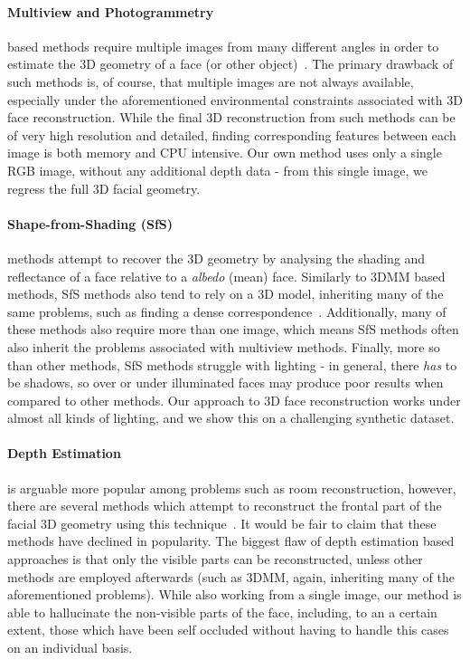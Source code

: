 \paragraph{Multiview and Photogrammetry} based methods require
multiple images from many different angles in order to estimate the 3D
geometry of a face (or other
object)~\cite{dou2018multi,dai2018coarse,Piotraschke_2016_CVPR,mayo20093d}. The
primary drawback of such methods is, of course, that multiple images
are not always available, especially under the aforementioned
environmental constraints associated with 3D face
reconstruction. While the final 3D reconstruction from such methods
can be of very high resolution and detailed, finding corresponding
features between each image is both memory and CPU intensive. Our own
method uses only a single RGB image, without any additional depth data
- from this single image, we regress the full 3D facial geometry.

\paragraph{Shape-from-Shading (SfS)} methods attempt to recover the 3D
geometry by analysing the shading and reflectance of a face relative
to a \textit{albedo} (mean) face. Similarly to 3DMM based methods, SfS
methods also tend to rely on a 3D model, inheriting many of the same
problems, such as finding a dense
correspondence~\cite{suwajanakorn2014total,jiang20183d}. Additionally,
many of these methods also require more than one image, which means
SfS methods often also inherit the problems associated with multiview
methods. Finally, more so than other methods, SfS methods struggle
with lighting - in general, there \textit{has} to be shadows, so over
or under illuminated faces may produce poor results when compared to
other methods. Our approach to 3D face reconstruction works under
almost all kinds of lighting, and we show this on a challenging
synthetic dataset.

\paragraph{Depth Estimation} is arguable more popular among problems
such as room reconstruction, however, there are several methods which
attempt to reconstruct the frontal part of the facial 3D geometry
using this technique~\cite{sun2011depth,sun2013depth}. It would be
fair to claim that these methods have declined in popularity. The
biggest flaw of depth estimation based approaches is that only the
visible parts can be reconstructed, unless other methods are employed
afterwards (such as 3DMM, again, inheriting many of the aforementioned
problems). While also working from a single image, our method is able
to hallucinate the non-visible parts of the face, including, to an a
certain extent, those which have been self occluded without having to
handle this cases on an individual basis.

